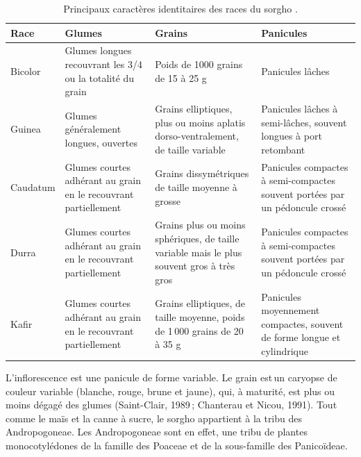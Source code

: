 \documentclass[a4paper,11pt]{article}
\begin{document}
\begin{table}
\begin{center}
  \begin{tabular}{|lb{4cm}|b{3.5cm}|b{3.5cm}|}
   \hline
  Race & Glumes  & Grains  & Panicules  \\ \hline
  Bicolor & Glumes longues recouvrant les 3/4 ou la totalité du grain  & Poids de 1000 grains de 15 à 25 g & Panicules lâches \\ \hline
  Guinea & Glumes généralement longues, ouvertes & Grains elliptiques, plus ou moins aplatis dorso-ventralement, de taille variable & Panicules lâches à semi-lâches, souvent longues à port retombant \\ \hline
  Caudatum & Glumes courtes adhérant au grain en le recouvrant partiellement & Grains dissymétriques de taille moyenne à grosse & Panicules compactes à semi-compactes souvent portées par un pédoncule crossé \\ \hline
  Durra & Glumes courtes adhérant au grain en le recouvrant partiellement & Grains plus ou moins sphériques, de taille variable mais le plus souvent gros à très gros & Panicules compactes à semi-compactes souvent portées par un pédoncule crossé \\ \hline
  Kafir & Glumes courtes adhérant au grain en le recouvrant partiellement & Grains elliptiques, de taille moyenne, poids de 1\,000 grains de 20 à 35 g & Panicules moyennement compactes, souvent de forme longue et cylindrique \\ \hline
\end{tabular}
\caption{Principaux caractères identitaires des races du sorgho \protect\cite{Chantereau_2013}.}
\label{tableau:Chantereau_2013}
\end{center}
\end{table}


 
\newpage



L’inflorescence est une panicule de forme variable. Le grain est\,un
caryopse de couleur variable (blanche, rouge, brune et jaune), qui, à
maturité, est plus ou moins dégagé des glumes (Saint-Clair, 1989\,;
Chanterau et Nicou, 1991). Tout comme le maïs et la canne à sucre, le
sorgho appartient à la tribu des Andropogoneae. Les Andropogoneae sont
en effet, une tribu de plantes monocotylédones de la famille des
Poaceae et de la sous-famille des Panicoïdeae.
\end{document}
